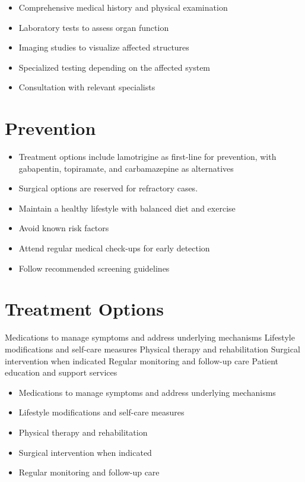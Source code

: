 \begin{itemize}[noitemsep]
  \item Comprehensive medical history and physical examination
  \item Laboratory tests to assess organ function
  \item Imaging studies to visualize affected structures
  \item Specialized testing depending on the affected system
  \item Consultation with relevant specialists
\end{itemize}
\section{Prevention}
\begin{itemize}[noitemsep]
  \item Treatment options include lamotrigine as first-line for prevention, with gabapentin, topiramate, and carbamazepine as alternatives
  \item Surgical options are reserved for refractory cases.
  \item Maintain a healthy lifestyle with balanced diet and exercise
  \item Avoid known risk factors
  \item Attend regular medical check-ups for early detection
  \item Follow recommended screening guidelines
\end{itemize}
\section{Treatment Options}
Medications to manage symptoms and address underlying mechanisms Lifestyle modifications and self-care measures Physical therapy and rehabilitation Surgical intervention when indicated Regular monitoring and follow-up care Patient education and support services

\begin{itemize}[noitemsep]
  \item Medications to manage symptoms and address underlying mechanisms
  \item Lifestyle modifications and self-care measures
  \item Physical therapy and rehabilitation
  \item Surgical intervention when indicated
  \item Regular monitoring and follow-up care
\end{itemize}
